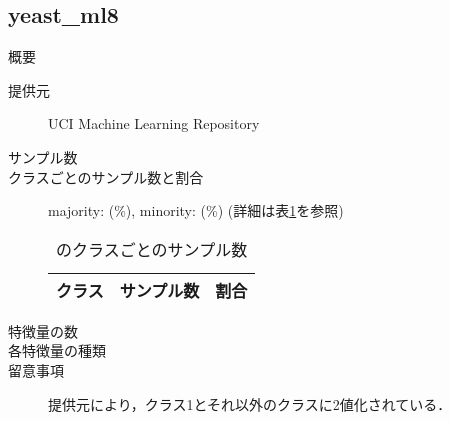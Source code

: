 \subsection{yeast\_ml8}
\begin{description}
    \item[概要] \cite{}
    \item[提供元] UCI Machine Learning Repository
    \item[サンプル数] 
    \item[クラスごとのサンプル数と割合] majority:  (\%), minority:  (\%) (詳細は表\ref{tab:}を参照)

        \begin{table}
            \centering
            \caption{のクラスごとのサンプル数}
            \label{tab:}
            \begin{tabular}{lrc} \hline
                \multicolumn{1}{c}{クラス}&
                \multicolumn{1}{c}{サンプル数}&
                \multicolumn{1}{c}{割合}\\
                \hline
                \hline

                \hline
            \end{tabular}
        \end{table}

    \item[特徴量の数] 
    \item[各特徴量の種類] \mbox{}
        
    \item[留意事項] 提供元により，クラス1とそれ以外のクラスに2値化されている．
\end{description}

